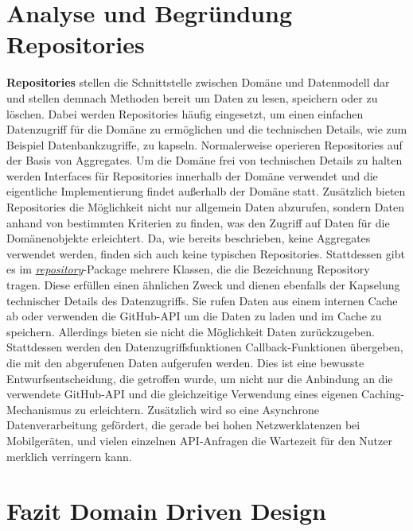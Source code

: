 \newpage

\section{Analyse und Begründung Repositories}
\textbf{Repositories} stellen die Schnittstelle zwischen Domäne und Datenmodell dar und stellen demnach Methoden bereit um Daten zu lesen, speichern oder zu löschen.
Dabei werden Repositories häufig eingesetzt, um einen einfachen Datenzugriff für die Domäne zu ermöglichen und die technischen Details, wie zum Beispiel Datenbankzugriffe, zu kapseln.
Normalerweise operieren Repositories auf der Basis von Aggregates.
Um die Domäne frei von technischen Details zu halten werden Interfaces für Repositories innerhalb der Domäne verwendet und die eigentliche Implementierung findet außerhalb der Domäne statt.
Zusätzlich bieten Repositories die Möglichkeit nicht nur allgemein Daten abzurufen, sondern Daten anhand von bestimmten Kriterien zu finden, was den Zugriff auf Daten für die Domänenobjekte erleichtert.
\newline
Da, wie bereits beschrieben, keine Aggregates verwendet werden, finden sich auch keine typischen Repositories.
Stattdessen gibt es im \textit{\href{https://github.com/lukaspanni/OpenSourceStats/tree/main/app/src/main/java/de/lukaspanni/opensourcestats/repository/}{repository}}-Package mehrere Klassen, die die Bezeichnung Repository tragen.
Diese erfüllen einen ähnlichen Zweck und dienen ebenfalls der Kapselung technischer Details des Datenzugriffs.
Sie rufen Daten aus einem internen Cache ab oder verwenden die GitHub-API um die Daten zu laden und im Cache zu speichern.
Allerdings bieten sie nicht die Möglichkeit Daten zurückzugeben. 
Stattdessen werden den Datenzugriffsfunktionen Callback-Funktionen übergeben, die mit den abgerufenen Daten aufgerufen werden.
Dies ist eine bewusste Entwurfsentscheidung, die getroffen wurde, um nicht nur die Anbindung an die verwendete GitHub-API und die gleichzeitige Verwendung eines eigenen Caching-Mechanismus zu erleichtern.
Zusätzlich wird  so eine Asynchrone Datenverarbeitung gefördert, die gerade bei hohen Netzwerklatenzen bei Mobilgeräten, und vielen einzelnen API-Anfragen die Wartezeit für den Nutzer merklich verringern kann.

\section{Fazit Domain Driven Design}

